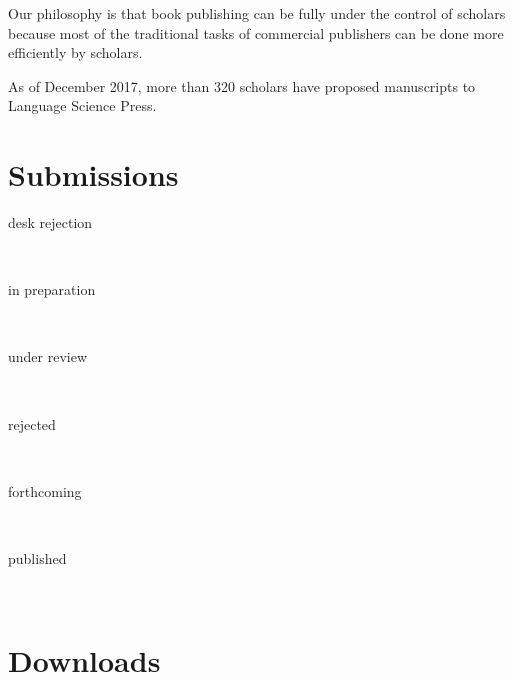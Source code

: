 \documentclass[
notumble,
nofoldmark,
]{leaflet}
\begin{document}
 Our philosophy is that book publishing can be fully under the control of scholars because most of the traditional tasks of commercial publishers can be done more efficiently by scholars. 
 
As of December 2017, more than 320 scholars have proposed manuscripts to Language Science Press.  

\newpage 
\newlength{\submissionfactor}
\setlength{\submissionfactor}{.5mm}
\newcommand{\submission}[3]{
\parbox[m][.1cm][c]{2.5cm}{\color{LIGHTGRAY} #1}\colorbox{#2}{\parbox[m][.3cm][c]{#3\submissionfactor}{\bfseries\sffamily #3}}\\ 
}

\section{\sffamily\Large\bfseries Submissions}
\submission{desk rejection}{lsRed}{50}
\submission{in preparation}{lsLightBlue}{43}
\submission{under review}{lsDarkBlue}{5}
\submission{rejected}{lsLightOrange}{14}
\submission{forthcoming}{lsSoftGreen}{33}
\submission{published}{lsRichGreen}{51}



 


\section{\sffamily\Large\bfseries Downloads}
\vspace*{-1em}
\parbox[b][0cm][b]{0cm}{
}

\setlength{\tabcolsep}{0pt}
\newlength{\downloadfactor}
\setlength{\downloadfactor}{.4mm}
\newcommand{\downloadbox}[4]{\begin{tabular}{p{#1.#2\downloadfactor}}\cellcolor{#3}\sffamily\bfseries~#1#2\rule{0pt}{1.5em}\\\mbox{#4}\end{tabular}\\[.1em]
\\}
\end{document}
